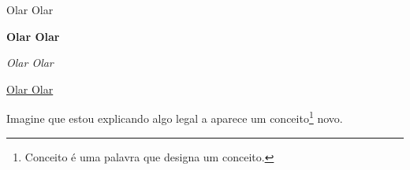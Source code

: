 \documentclass{article}
\begin{document}
Olar Olar

\textbf{Olar Olar}

\textit{Olar Olar}

\underline{Olar Olar}

Imagine que estou explicando algo legal a aparece um conceito\footnote{Conceito é uma palavra que designa um conceito.} novo.
\end{document}
